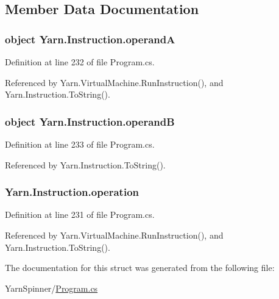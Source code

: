 \subsection{Member Data Documentation}
\hypertarget{a00113_ab5d386faa0d3dbc23db80f8e62706afd}{
\subsubsection[{operand\-A}]{\setlength{\rightskip}{0pt plus 5cm}object Yarn.\-Instruction.\-operand\-A}}\label{a00113_ab5d386faa0d3dbc23db80f8e62706afd}


Definition at line 232 of file Program.\-cs.



Referenced by Yarn.\-Virtual\-Machine.\-Run\-Instruction(), and Yarn.\-Instruction.\-To\-String().

\hypertarget{a00113_a56348c6fe7eb919b7277afc06e5b224a}{
\subsubsection[{operand\-B}]{\setlength{\rightskip}{0pt plus 5cm}object Yarn.\-Instruction.\-operand\-B}}\label{a00113_a56348c6fe7eb919b7277afc06e5b224a}


Definition at line 233 of file Program.\-cs.



Referenced by Yarn.\-Instruction.\-To\-String().

\hypertarget{a00113_a566bf5f7198cc353ea5c3710cb3a31cb}{
\subsubsection[{operation}]{ Yarn.\-Instruction.\-operation}}\label{a00113_a566bf5f7198cc353ea5c3710cb3a31cb}


Definition at line 231 of file Program.\-cs.



Referenced by Yarn.\-Virtual\-Machine.\-Run\-Instruction(), and Yarn.\-Instruction.\-To\-String().



The documentation for this struct was generated from the following file\-:\begin{DoxyCompactItemize}
\item 
Yarn\-Spinner/\hyperlink{a00289}{Program.\-cs}\end{DoxyCompactItemize}
